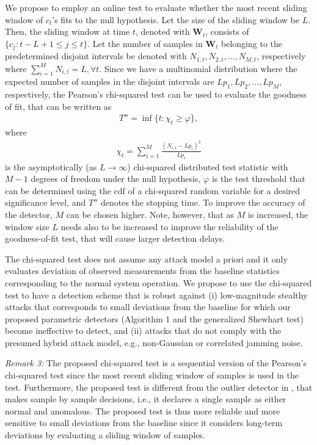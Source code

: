 \documentclass[onecolumn]{IEEEtran}
\def\inf{\mathop{\mathrm{inf}}}
\begin{document}
We propose to employ an online test to evaluate whether the most recent sliding window of $c_t$'s fits to the null hypothesis. Let the size of the sliding window be $L$. Then, the sliding window at time $t$, denoted with $\mathbf{W}_t$, consists of $\{c_j: t-L+1 \leq j \leq t\}$. Let the number of samples in $\mathbf{W}_t$ belonging to the predetermined disjoint intervals be denoted with $N_{1,t}, N_{2,t}, \dots, N_{M,t}$, respectively where $\sum_{i=1}^{M} N_{i,t} = L, \forall t$. Since we have a multinomial distribution where the expected number of samples in the disjoint intervals are $L p_1, L p_2, \dots, L p_M$, respectively, the Pearson's chi-squared test can be used to evaluate the goodness of fit, that can be written as
\begin{gather}\label{chi_squ}
T'' = \inf\{t: \chi_t \geq \varphi\},
\end{gather}
where
\begin{gather}\label{eq:Pearson}
\chi_t = \sum_{i=1}^{M} \frac{(N_{i,t} - L p_i)^2}{L p_i}
\end{gather}
is the asymptotically (as $L \rightarrow \infty$) chi-squared distributed test statistic with $M-1$ degrees of freedom under the null hypothesis, $\varphi$ is the test threshold that can be determined using the cdf of a chi-squared random variable for a desired significance level, and $T''$ denotes the stopping time. To improve the accuracy of the detector, $M$ can be chosen higher. Note, however, that as $M$ is increased, the window size $L$ needs also to be increased to improve the reliability of the goodness-of-fit test, that will cause larger detection delays.

{The chi-squared test does not assume any attack model a priori and it only evaluates deviation of observed measurements from the baseline statistics corresponding to the normal system operation. We propose to use the chi-squared test to have a detection scheme that is robust
against (i) low-magnitude stealthy attacks that corresponds to small deviations from the baseline for which our proposed parametric detectors (Algorithm 1 and the generalized Shewhart test) become ineffective to detect, and (ii) attacks that do not comply with the presumed hybrid attack model, e.g., non-Gaussian or correlated jamming noise.}

\textit{Remark 3:} The proposed chi-squared test is a sequential version of the Pearson's chi-squared test since the most recent sliding window of samples is used in the test. Furthermore, the proposed test is different from the outlier detector in \cite{Brumback87}, that makes sample by sample decisions, i.e., it declares a single sample as either normal and anomalous. The proposed test is thus more reliable and more sensitive to small deviations from the baseline since it considers long-term deviations by evaluating a sliding window of samples.
\end{document}

